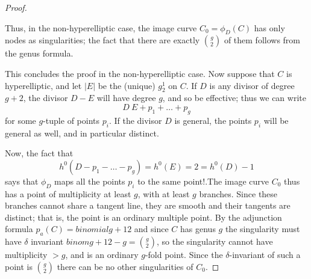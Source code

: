 \begin{proof}
\begin{itemize}
% 

Thus, in the non-hyperelliptic case, the image curve $C_0 = \phi_D(C)$ has only nodes as singularities; the fact that there are exactly $\binom{g}{2}$ of them follows from the genus formula.
\end{itemize}

This concludes the proof in the non-hyperelliptic case. Now suppose that $C$ is hyperelliptic, and let $|E|$ be the (unique) $g^1_2$ on $C$. If  $D$ is any divisor of degree $g+2$, the divisor $D - E$ will have degree $g$, and so be effective; thus we can write
$$
D ~ E + p_1 + \dots + p_g
$$
for some $g$-tuple of points $p_i$. If the divisor $D$ is general, the points $p_i$ will be general as well, and in particular distinct.

Now, the fact that
$$
h^0(D - p_1 - \dots - p_g) = h^0(E) = 2 = h^0(D) - 1
$$
says that $\phi_D$ maps all the points $p_i$ to the same point!.The image curve $C_0$ thus has a point of multiplicity at least $g$, with at least $g$ branches. Since these branches cannot share a tangent line,
they are smooth and their tangents are distinct; that is, the point is an ordinary multiple point. By the adjunction
formula $p_a(C) = binomial{g+1}{2}$ and since $C$ has genus $g$ the singularity must have $\delta$ invariant
$binom{g+1}{2} -g = \binom{g}{2}$, so the singularity cannot have multiplicity $>g$, and is an ordinary $g$-fold point. Since the $\delta$-invariant of such a point is $\binom{g}{2}$  there can be no other singularities of $C_0$.
\end{proof}





